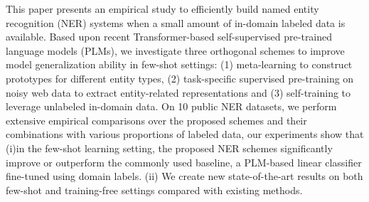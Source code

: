 This paper presents an empirical study to efficiently build named entity recognition (NER) systems when a small amount of in-domain labeled data is available. Based upon recent Transformer-based self-supervised pre-trained language models (PLMs), we investigate three orthogonal schemes to improve model generalization ability in few-shot settings: (1) meta-learning to construct prototypes for different entity types, (2) task-specific supervised pre-training on noisy web data to extract entity-related representations and (3) self-training to leverage unlabeled in-domain data. On 10 public NER datasets, we perform extensive empirical comparisons over the proposed schemes and their combinations with various proportions of labeled data, our experiments show that (i)in the few-shot learning setting, the proposed NER schemes significantly improve or outperform the commonly used baseline, a PLM-based linear classifier fine-tuned using domain labels. (ii) We create new state-of-the-art results on both few-shot and training-free settings compared with existing methods.
